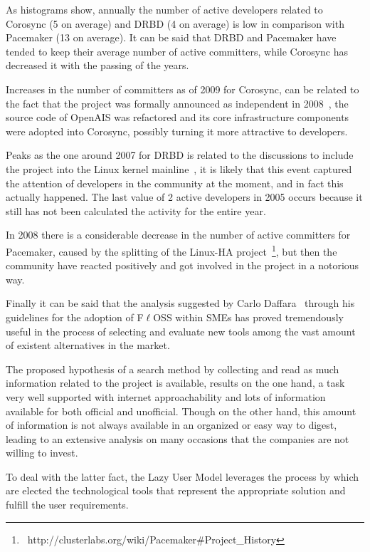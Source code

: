 \documentclass[a4paper, 12pt]{book}
\begin{document}
\noindent As histograms show, annually the number of active developers related to Corosync (5 on average) and DRBD (4 on average) is low in comparison with Pacemaker (13 on average). It can be said that DRBD and Pacemaker have tended to keep their average number of active committers, while Corosync has decreased it with the passing of the years.\bigskip

\noindent Increases in the number of committers as of 2009 for Corosync, can be related to the fact that the project was formally announced as independent in 2008~\cite{CRS}, the source code of OpenAIS was refactored and its core infrastructure components were adopted into Corosync, possibly turning it more attractive to developers.\bigskip

\noindent Peaks as the one around 2007 for DRBD is related to the discussions to include the project into the Linux kernel mainline~\cite{ELDRBD}, it is likely that this event captured the attention of developers in the community at the moment, and in fact this actually happened. The last value of 2 active developers in 2005 occurs because it still has not been calculated the activity for the entire year.\bigskip

\noindent In 2008 there is a considerable decrease in the number of active committers for Pacemaker, caused by the splitting of the Linux-HA project~\footnote{{\tiny\ http://clusterlabs.org/wiki/Pacemaker\#Project\_History}}, but then the community have reacted positively and got involved in the project in a notorious way.\bigskip


\noindent Finally it can be said that the analysis suggested by Carlo Daffara~\cite{Daffara1} through his guidelines for the adoption of F$\ell$OSS within SMEs has proved tremendously useful in the process of selecting and evaluate new tools among the vast amount of existent alternatives in the market.\bigskip

\noindent The proposed hypothesis of a search method by collecting and read as much information related to the project is available, results on the one hand, a task very well supported with internet approachability and lots of information available for both official and unofficial. Though on the other hand, this amount of information is not always available in an organized or easy way to digest, leading to an extensive analysis on many occasions that the companies are not willing to invest.\bigskip

\noindent To deal with the latter fact, the Lazy User Model leverages the process by which are elected the technological tools that represent the appropriate solution and fulfill the user requirements. 
\end{document}

